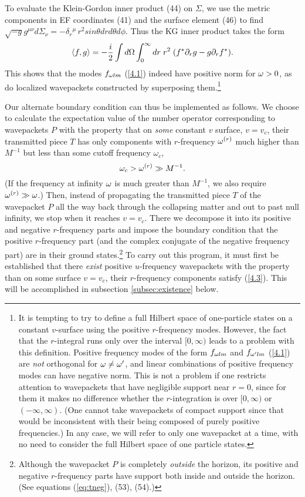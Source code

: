 To evaluate the Klein-Gordon inner product (44) on $\Sigma$,
we use the metric components in EF
coordinates (41) and the surface element (46) to find
$\sqrt{-g}g^{\mu\nu}d\Sigma_\nu
=-\delta_r{}^\mu\, r^2 sin\theta dr d\theta d\phi$.
Thus the KG inner product takes the form
\begin{equation}
\langle f,g\rangle = -{i\over2}\int d\Omega \int_0^\infty dr
\; r^2 \; (f^*\partial_r g-g\partial_rf^*).
\label{KGnorm}
\end{equation}
This shows that the modes $f_{\omega lm}$ (\ref{4.1}) indeed have
positive norm for $\omega>0$, as do localized wavepackets
constructed by superposing them.\footnote{It is tempting
to try to define a
full Hilbert space of one-particle states on a constant
$v$-surface using the positive $r$-frequency modes.
However, the fact that the $r$-integral runs
only over the interval $[0,\infty)$ leads to a problem with
this definition. Positive frequency modes of the form $f_{\omega lm}$
and $f_{\omega' lm}$ (\ref{4.1}) are {\it not} orthogonal for $\omega\ne\omega'$,
and linear combinations of positive frequency modes can have
negative norm. This is not a problem if one restricts
attention to wavepackets that have negligible
support near $r=0$, since for them it makes no difference whether
the $r$-integration is over $[0,\infty)$ or $(-\infty,\infty)$.
(One cannot take wavepackets of compact support since that would
be inconsistent with their being composed of purely positive
frequencies.) In any case, we will refer to only one wavepacket
at a time, with no need to consider the full Hilbert space of
one particle states.}

Our alternate boundary condition can thus be implemented as
follows. We choose to calculate the expectation value of
the number operator corresponding to wavepackets $P$
with the property that on {\it some} constant $v$ surface,
$v=v_c$, their transmitted piece $T$ has only
components with $r$-frequency $\omega^{(r)}$ much higher than $M^{-1}$
but less than some cutoff frequency $\omega_c$,
\begin{equation}
\omega_c>\omega^{(r)}\gg M^{-1}.
\label{4.3}
\end{equation}
(If the frequency at infinity $\omega$ is much greater than
$M^{-1}$, we also require $\omega^{(r)}\gg\omega$.)
Then, instead of propagating the transmitted
piece $T$ of the wavepacket $P$ all the way back
through the collapsing matter and out to past null infinity,
we stop when it reaches $v=v_c$.
There we decompose it into its positive and negative
$r$-frequency parts and impose the boundary condition that the
positive $r$-frequency part (and the complex conjugate of
the negative frequency part) are in their ground
states.\footnote{Although the wavepacket $P$ is completely
{\it outside} the horizon, its positive and negative
$r$-frequency parts have support both inside and outside the
horizon. (See equations (\ref{eq:tneg}), (53), (54).)}
To carry out this program, it must first be established that
there {\it exist} positive $u$-frequency wavepackets with the
property than on some surface $v=v_c$, their $r$-frequency
components satisfy (\ref{4.3}). This will be accomplished in
subsection \ref{subsec:existence} below.

